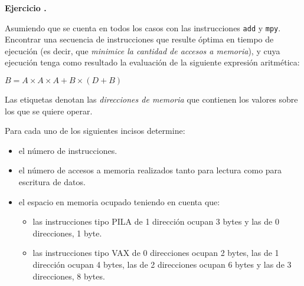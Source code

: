\documentclass[12pt,a4paper]{article}
\newcounter{ctej}
\newcommand{\ejercicio}{\vspace{1em}\noindent\textbf{Ejercicio \arabic{ctej}.} \addtocounter{ctej}{1}}
\begin{document}


\ejercicio Asumiendo que se cuenta en todos los casos con las instrucciones \texttt{add} y \texttt{mpy}. Encontrar una secuencia de instrucciones que resulte óptima en tiempo de ejecución (es decir, que \textit{minimice la cantidad de accesos a memoria}), y cuya ejecución tenga como resultado la evaluación de la siguiente expresión aritmética: \\[-0.6cm]
\begin{center}
$B = A \times A \times A + B \times (D + B)$
\end{center}
Las etiquetas denotan las \textit{direcciones de memoria} que contienen los valores sobre los que se quiere operar. 

Para cada uno de los siguientes incisos determine:\begin{itemize} \itemsep5pt \parskip-5pt 
	\item el número de instrucciones.
	\item el número de accesos a memoria realizados tanto para lectura como para escritura de datos.
	\item el espacio en memoria ocupado teniendo en cuenta que:\begin{itemize}
		\item las instrucciones tipo PILA de 1 dirección ocupan 3 bytes y las de 0 direcciones, 1 byte.
		\item las instrucciones tipo VAX de 0 direcciones ocupan 2 bytes, las de 1 dirección ocupan 4 bytes, las de 2 direcciones ocupan 6 bytes y las de 3 direcciones, 8 bytes.
	\end{itemize} 
\end{itemize}
\end{document}
